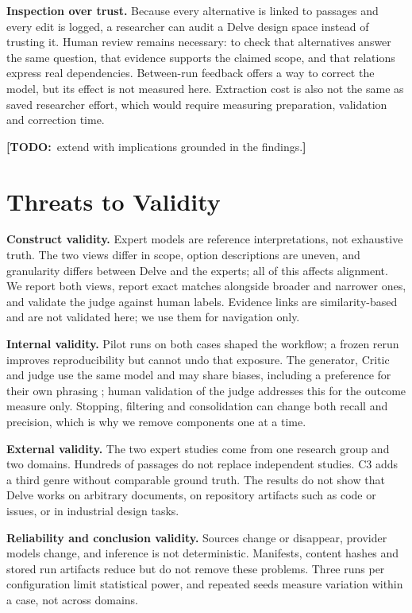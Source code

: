\documentclass[conference]{IEEEtran}
\newcommand{\todo}[1]{{\color{red}\textbf{[TODO:}~#1\textbf{]}}}
\begin{document}
\textbf{Inspection over trust.} Because every alternative is linked to passages and every edit is logged, a researcher can audit a Delve design space instead of trusting it. Human review remains necessary: to check that alternatives answer the same question, that evidence supports the claimed scope, and that relations express real dependencies. Between-run feedback offers a way to correct the model, but its effect is not measured here. Extraction cost is also not the same as saved researcher effort, which would require measuring preparation, validation and correction time.

\todo{extend with implications grounded in the findings.}

\section{Threats to Validity}

\textbf{Construct validity.} Expert models are reference interpretations, not exhaustive truth. The two views differ in scope, option descriptions are uneven, and granularity differs between Delve and the experts; all of this affects alignment. We report both views, report exact matches alongside broader and narrower ones, and validate the judge against human labels. Evidence links are similarity-based and are not validated here; we use them for navigation only.

\textbf{Internal validity.} Pilot runs on both cases shaped the workflow; a frozen rerun improves reproducibility but cannot undo that exposure. The generator, Critic and judge use the same model and may share biases, including a preference for their own phrasing \cite{judge}; human validation of the judge addresses this for the outcome measure only. Stopping, filtering and consolidation can change both recall and precision, which is why we remove components one at a time.

\textbf{External validity.} The two expert studies come from one research group and two domains. Hundreds of passages do not replace independent studies. C3 adds a third genre without comparable ground truth. The results do not show that Delve works on arbitrary documents, on repository artifacts such as code or issues, or in industrial design tasks.

\textbf{Reliability and conclusion validity.} Sources change or disappear, provider models change, and inference is not deterministic. Manifests, content hashes and stored run artifacts reduce but do not remove these problems. Three runs per configuration limit statistical power, and repeated seeds measure variation within a case, not across domains.
\end{document}
